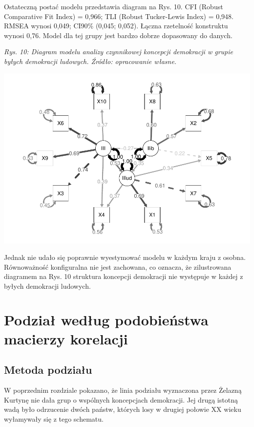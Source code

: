 \documentclass[12pt]{article}
\begin{document}
Ostateczną postać modelu przedstawia diagram na Rys. 10. CFI (Robust Comparative Fit Index) = 0,966; TLI (Robust Tucker-Lewis Index) = 0,948. RMSEA wynosi 0,049; CI90\% (0,045; 0,052). Łączna rzetelność konstruktu wynosi 0,76. Model dla tej grupy jest bardzo dobrze dopasowany do danych.

\emph{Rys. 10: Diagram modelu analizy czynnikowej koncepcji demokracji w grupie byłych demokracji ludowych. Źródło: opracowanie własne.}

\begin{center}\includegraphics{text_ASA_files/figure-latex/diagram-east-1} \end{center}

Jednak nie udało się poprawnie wyestymować modelu w każdym kraju z osobna. Równoważność konfiguralna nie jest zachowana, co oznacza, że zilustrowana diagramem na Rys. 10 struktura koncepcji demokracji nie występuje w każdej z byłych demokracji ludowych.

\hypertarget{podziaux142-wedux142ug-podobieux144stwa-macierzy-korelacji}{%
\section{Podział według podobieństwa macierzy korelacji}\label{podziaux142-wedux142ug-podobieux144stwa-macierzy-korelacji}}

\hypertarget{metoda-podziaux142u}{%
\subsection{Metoda podziału}\label{metoda-podziaux142u}}

W poprzednim rozdziale pokazano, że linia podziału wyznaczona przez Żelazną Kurtynę nie dała grup o wspólnych koncepcjach demokracji. Jej drugą istotną wadą było odrzucenie dwóch państw, których losy w drugiej połowie XX wieku wyłamywały się z tego schematu.
\end{document}
